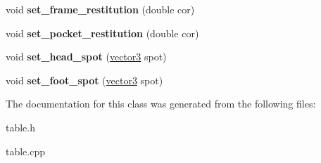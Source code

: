\begin{DoxyCompactItemize}
\item 
\hypertarget{class_table_a1385abec9e2b3ab150c3ac16fb301d73}{
void {\bfseries set\_\-frame\_\-restitution} (double cor)}
\label{class_table_a1385abec9e2b3ab150c3ac16fb301d73}

\item 
\hypertarget{class_table_ac2256d004b5f1b1e71c90711c072190a}{
void {\bfseries set\_\-pocket\_\-restitution} (double cor)}
\label{class_table_ac2256d004b5f1b1e71c90711c072190a}

\item 
\hypertarget{class_table_a0df624405f008ece249f6de92f7da6b1}{
void {\bfseries set\_\-head\_\-spot} (\hyperlink{classvector3d}{vector3} spot)}
\label{class_table_a0df624405f008ece249f6de92f7da6b1}

\item 
\hypertarget{class_table_a4b2c8c0836984fd5b3523b3e05b9c2bc}{
void {\bfseries set\_\-foot\_\-spot} (\hyperlink{classvector3d}{vector3} spot)}
\label{class_table_a4b2c8c0836984fd5b3523b3e05b9c2bc}

\end{DoxyCompactItemize}


The documentation for this class was generated from the following files:\begin{DoxyCompactItemize}
\item 
table.h\item 
table.cpp\end{DoxyCompactItemize}
